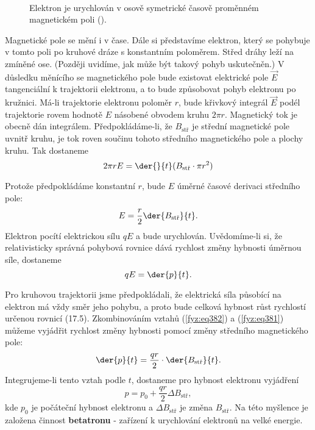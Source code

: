   \begin{figure}[hb!]
    \centering
                  \\
    \caption{Elektron je urychlován v osově symetrické časově proměnném magnetickém poli
             (\cite[s.~297]{Feynman02}).}
    \label{fyz:fig0335}
  \end{figure}
  
  Magnetické pole se mění i v čase. Dále si představíme elektron, který se pohybuje v tomto poli po 
  kruhové dráze s konstantním poloměrem. Střed dráhy leží na zmíněné ose. (Později uvidíme, jak 
  může být takový pohyb uskutečněn.) V důsledku měnícího se magnetického pole bude existovat 
  elektrické pole \(\vec{E}\) tangenciální k trajektorii elektronu, a to bude způsobovat pohyb 
  elektronu po kružnici. Má-li trajektorie elektronu poloměr \(r\), bude křivkový integrál 
  \(\vec{E}\) podél trajektorie rovem hodnotě \(E\) násobené obvodem kruhu \(2\pi r\). Magnetický 
  tok je obecně dán integrálem. Předpokládáme-li, že \(B_{\text{stř}}\) je střední magnetické pole 
  uvnitř kruhu, je tok roven součinu tohoto středního magnetického pole a plochy kruhu. Tak 
  dostaneme
  \begin{equation*}
    2\pi rE = \der{}{t}(B_\text{stř}\cdot\pi r^2)
  \end{equation*}
  
  Protože předpokládáme konstantní \(r\), bude \(E\) úměrné časové derivaci středního pole:
  \begin{equation}\label{fyz:eq381}
    E = \frac{r}{2}\der{B_{\text{stř}}}{t}.
  \end{equation}
  Elektron pocítí elektrickou sílu \(qE\) a bude urychlován. Uvědomíme-li si, že relativisticky 
  správná pohybová rovnice dává rychlost změny hybnosti úměrnou síle, dostaneme
  \begin{equation}\label{fyz:eq382}
    qE = \der{p}{t}.
  \end{equation}
  
  Pro kruhovou trajektorii jsme předpokládali, že elektrická síla působící na elektron má vždy směr 
  jeho pohybu, a proto bude celková hybnost růst rychlostí určenou rovnicí (17.5). Zkombinováním 
  vztahů (\ref{fyz:eq382}) a (\ref{fyz:eq381}) můžeme vyjádřit rychlost změny hybnosti pomocí změny 
  středního magnetického pole:
  \begin{equation}\label{fyz:eq383}
    \der{p}{t} = \frac{qr}{2}\cdot\der{B_{\text{stř}}}{t}.
  \end{equation}
   Integrujeme-li tento vztah podle \(t\), dostaneme pro hybnost elektronu vyjádření
  \begin{equation}\label{fyz:eq384}
    p = p_0 + \frac{qr}{2}\Delta B_{\text{stř}},
  \end{equation}
  kde \(p_0\) je počáteční hybnost elektronu a \(\Delta B_{\text{stř}}\) je změna 
  \(B_{\text{stř}}\). Na této myšlence je založena činnost \textbf{betatronu} - zařízení k 
  urychlování elektronů na velké energie.
   
